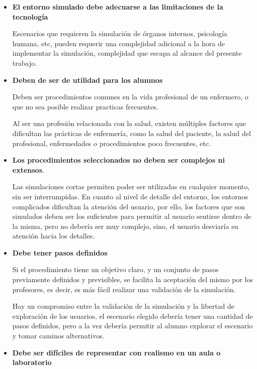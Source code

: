 \begin{itemize}

\item \textbf{El entorno simulado debe adecuarse a las limitaciones de la
        tecnología} 

    Escenarios que requieren la simulación de órganos internos, psicología
    humana, etc, pueden requerir una complejidad adicional a la hora de
    implementar la simulación, complejidad que escapa al alcance del presente
    trabajo.

\item \textbf{Deben de ser de utilidad para los alumnos} 
    
    Deben ser procedimientos comunes en la vida profesional de un enfermero, o
    que no sea posible realizar practicas frecuentes. 

    Al ser una profesión relacionada con la salud, existen múltiples factores
    que dificultan las prácticas de enfermería, como la salud del paciente, la
    salud del profesional, enfermedades o procedimientos poco frecuentes, etc.

\item \textbf{Los procedimientos seleccionados no deben ser complejos ni
        extensos}. 

    Las simulaciones cortas permiten poder ser utilizadas en cualquier momento,
    sin ser interrumpidas. En cuanto al nivel de detalle del entorno, los
    entornos complicados dificultan la atención del
    usuario\cite{videojuegos:gonzaleztardon}, por ello, los factores que son
    simulados deben ser los suficientes para permitir al usuario sentirse dentro
    de la misma, pero no debería ser muy complejo, sino, el usuario desviaría su
    atención hacia los detalles.

\item \textbf{Debe tener pasos definidos}
    
    Si el procedimiento tiene un objetivo claro, y un conjunto de pasos
    previamente definidos y previsibles, se facilita la aceptación del mismo por
    los profesores, es decir, es más fácil realizar una validación de la
    simulación.

    Hay un compromiso entre la validación de la simulación y la libertad de
    exploración de los usuarios, el escenario elegido debería tener una cantidad
    de pasos definidos, pero a la vez debería permitir al alumno explorar el
    escenario y tomar caminos alternativos.

\item \textbf{Debe ser difíciles de representar con realismo en un aula o
        laboratorio}


\end{itemize}
